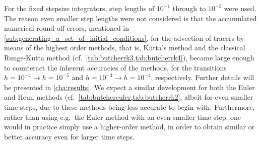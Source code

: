 For the fixed stepsize integrators, step lengths of $10^{-1}$ through to
$10^{-5}$ were used. The reason even smaller step lengths were not considered
is that the accumulated numerical round-off errors, mentioned in
\cref{sub:generating_a_set_of_initial_conditions}, for the advection
of tracers by means of the highest order methods, that is, Kutta's method and
the classical Runge-Kutta method (cf.\ \cref{tab:butcherrk3,tab:butcherrk4}),
became large enough to counteract the inherent accuracies of the methods,
for the transitions $h=10^{-4}\rightarrow{}h=10^{-5}$ and
$h=10^{-3}\rightarrow{}h=10^{-4}$, respectively. Further details will be
presented in \cref{cha:results}. We expect a similar development for both
the Euler and Heun methods (cf.\ \cref{tab:butchereuler,tab:butcherrk2},
albeit for even smaller time steps, due to these methods being less accurate
to begin with. Furthermore, rather than using e.g.\ the Euler method with
an even smaller time step, one would in practice simply use a higher-order
method, in order to obtain similar or better accuracy even for larger
time steps.

